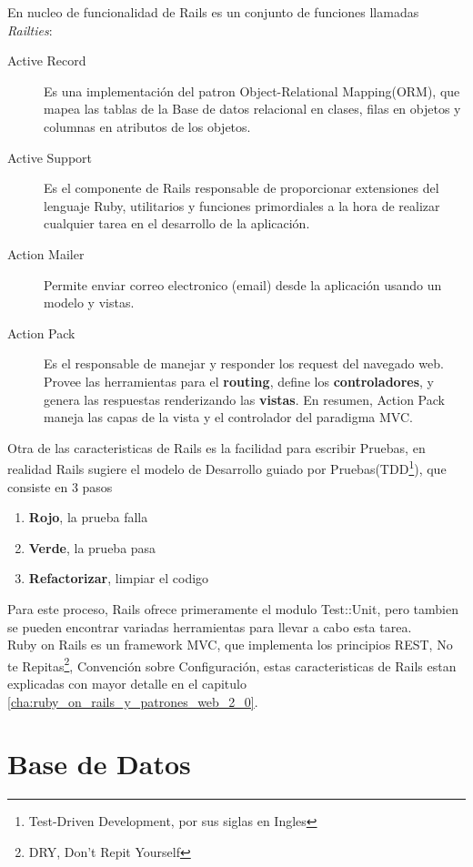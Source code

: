     En nucleo de funcionalidad de Rails es un conjunto de funciones llamadas \emph{Railties}:
    \begin{description}
      \item[Active Record] Es una implementaci\'on del patron
        Object-Relational Mapping(ORM), que mapea las tablas de la Base de datos relacional en clases, filas en objetos y 
        columnas en atributos de los objetos.   
      \item[Active Support] Es el componente de Rails responsable de proporcionar extensiones del lenguaje Ruby, utilitarios y funciones primordiales a la hora de realizar cualquier tarea en el desarrollo de la aplicaci\'on.  
      \item[Action Mailer] Permite enviar correo electronico (email) desde la aplicaci\'on usando un  modelo y vistas.
      \item[Action Pack] Es el responsable de manejar y responder los request del navegado web. Provee las herramientas para el \textbf{routing}, define los \textbf{controladores}, y genera las respuestas renderizando las \textbf{vistas}. En resumen, Action Pack maneja las capas de la vista y el controlador del paradigma MVC.  
    \end{description}
    Otra de las caracteristicas de Rails es la facilidad para escribir Pruebas, en realidad Rails sugiere el modelo de Desarrollo guiado por Pruebas(TDD\footnote{Test-Driven Development, por sus siglas en Ingles}), que consiste en 3 pasos
    \begin{enumerate}
      \item \textbf{Rojo}, la prueba falla
      \item \textbf{Verde}, la prueba pasa
      \item \textbf{Refactorizar}, limpiar el codigo 
    \end{enumerate}
    Para este proceso, Rails ofrece primeramente el modulo Test::Unit, pero tambien se pueden encontrar variadas herramientas para llevar a cabo esta tarea.\\

    Ruby on Rails es un framework MVC, que implementa los principios REST, No te Repitas\footnote{DRY, Don't Repit Yourself}, Convenci\'on sobre Configuraci\'on, estas caracteristicas de Rails estan explicadas con mayor detalle en el capitulo \ref{cha:ruby_on_rails_y_patrones_web_2_0}.



  \section{Base de Datos} %
  \label{sec:base_de_datos}

